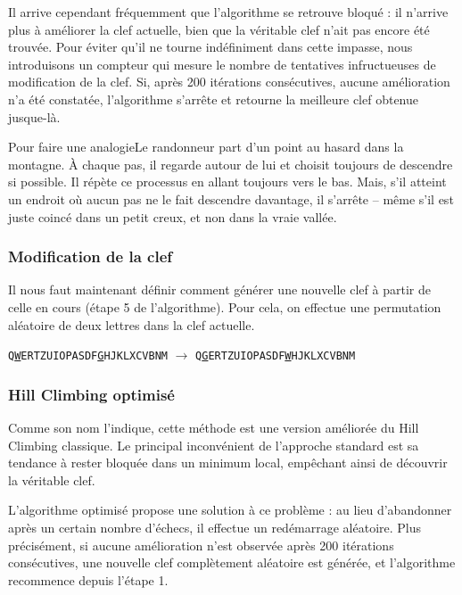 \documentclass[a4paper]{article}
\begin{document}
Il arrive cependant fréquemment que l’algorithme se retrouve bloqué : il n’arrive plus à améliorer la clef actuelle, bien que la véritable clef n’ait pas encore été trouvée.  
Pour éviter qu’il ne tourne indéfiniment dans cette impasse, nous introduisons un compteur qui mesure le nombre de tentatives infructueuses de modification de la clef.  
Si, après 200 itérations consécutives, aucune amélioration n’a été constatée, l’algorithme s’arrête et retourne la meilleure clef obtenue jusque-là.


Pour faire une analogieLe randonneur part d’un point au hasard dans la montagne. À chaque pas, il regarde autour de lui et choisit toujours de descendre si possible. Il répète ce processus en allant toujours vers le bas. Mais, s’il atteint un endroit où aucun pas ne le fait descendre davantage, il s’arrête – même s’il est juste coincé dans un petit creux, et non dans la vraie vallée.
\subsubsection*{Modification de la clef}

Il nous faut maintenant définir comment générer une nouvelle clef à partir de celle en cours (étape 5 de l’algorithme).  
Pour cela, on effectue une permutation aléatoire de deux lettres dans la clef actuelle.

\begin{center}
\texttt{Q\underline{W}ERTZUIOPASDF\underline{G}HJKLXCVBNM} $\rightarrow$ \texttt{Q\underline{G}ERTZUIOPASDF\underline{W}HJKLXCVBNM}
\end{center}


\subsubsection{Hill Climbing optimisé}

Comme son nom l’indique, cette méthode est une version améliorée du Hill Climbing classique.  
Le principal inconvénient de l’approche standard est sa tendance à rester bloquée dans un minimum local, empêchant ainsi de découvrir la véritable clef.

L’algorithme optimisé propose une solution à ce problème : au lieu d’abandonner après un certain nombre d’échecs, il effectue un redémarrage aléatoire.  
Plus précisément, si aucune amélioration n’est observée après 200 itérations consécutives, une nouvelle clef complètement aléatoire est générée, et l’algorithme recommence depuis l’étape 1.
\end{document}

